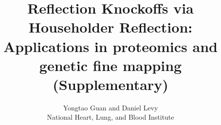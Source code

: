 \documentclass[12pt,Times]{article}
\begin{document}

\renewcommand{\thefigure}{S\arabic{figure}}  %

\renewcommand{\figurename}{Fig.}  %

\renewcommand{\thetable}{S\arabic{table}}  %

\renewcommand{\tablename}{Tab.}  %



\title{Reflection Knockoffs via Householder Reflection: Applications in proteomics and genetic fine mapping (Supplementary)}

\author{Yongtao Guan and Daniel Levy \protect\\  National Heart, Lung, and Blood Institute}
\maketitle




%



\end{document}
